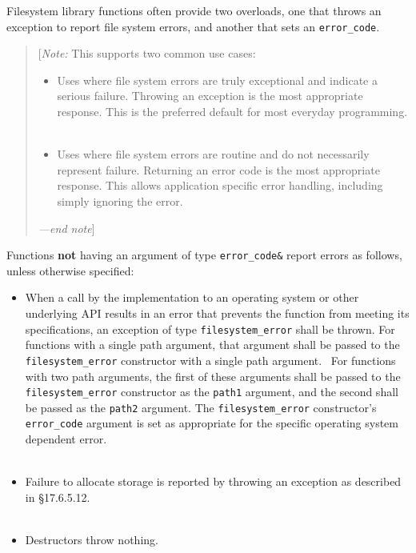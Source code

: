 Filesystem library functions often provide two overloads, one that
throws an exception to report file system errors, and another that sets
an \texttt{error\_code}.

\begin{quote}
{[}\emph{Note:} This supports two common use cases:

\begin{itemize}
\tightlist
\item
  Uses where file system errors are truly exceptional and indicate a
  serious failure. Throwing an exception is the most appropriate
  response. This is the preferred default for most everyday
  programming.\\
   ~
\item
  Uses where file system errors are routine and do not necessarily
  represent failure. Returning an error code is the most appropriate
  response. This allows application specific error handling, including
  simply ignoring the error.
\end{itemize}

\emph{---end note}{]}
\end{quote}

Functions \textbf{not} having an argument of type \texttt{error\_code\&}
report errors as follows, unless otherwise specified:

\begin{itemize}
\tightlist
\item
  When a call by the implementation to an operating system or other
  underlying API results in an error that prevents the function from
  meeting its specifications, an exception of type
  \texttt{filesystem\_error} shall be thrown. For functions with a
  single path argument, that argument shall be passed to the
  \texttt{filesystem\_error} constructor with a single path argument.~
  For functions with two path arguments, the first of these arguments
  shall be passed to the \texttt{filesystem\_error} constructor as the
  \texttt{path1} argument, and the second shall be passed as the
  \texttt{path2} argument. The \texttt{filesystem\_error} constructor's
  \texttt{error\_code} argument is set as appropriate for the specific
  operating system dependent error.\\
   ~
\item
  Failure to allocate storage is reported by throwing an exception as
  described in §17.6.5.12.\\
   ~
\item
  Destructors throw nothing.
\end{itemize}

